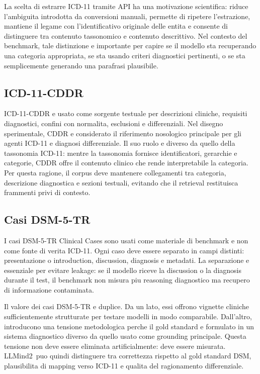\documentclass[11pt,a4paper]{article}
\newcommand{\llmind}{LLMind2}
\begin{document}
La scelta di estrarre ICD-11 tramite API ha una motivazione scientifica: riduce l'ambiguita introdotta da conversioni manuali, permette di ripetere l'estrazione, mantiene il legame con l'identificativo originale delle entita e consente di distinguere tra contenuto tassonomico e contenuto descrittivo. Nel contesto del benchmark, tale distinzione e importante per capire se il modello sta recuperando una categoria appropriata, se sta usando criteri diagnostici pertinenti, o se sta semplicemente generando una parafrasi plausibile.

\subsection{ICD-11-CDDR}
ICD-11-CDDR e usato come sorgente testuale per descrizioni cliniche, requisiti diagnostici, confini con normalita, esclusioni e differenziali. Nel disegno sperimentale, CDDR e considerato il riferimento nosologico principale per gli agenti ICD-11 e diagnosi differenziale. Il suo ruolo e diverso da quello della tassonomia ICD-11: mentre la tassonomia fornisce identificatori, gerarchie e categorie, CDDR offre il contenuto clinico che rende interpretabile la categoria. Per questa ragione, il corpus deve mantenere collegamenti tra categoria, descrizione diagnostica e sezioni testuali, evitando che il retrieval restituisca frammenti privi di contesto.

\subsection{Casi DSM-5-TR}
I casi DSM-5-TR Clinical Cases sono usati come materiale di benchmark e non come fonte di verita ICD-11. Ogni caso deve essere separato in campi distinti: presentazione o introduction, discussion, diagnosis e metadati. La separazione e essenziale per evitare leakage: se il modello riceve la discussion o la diagnosis durante il test, il benchmark non misura piu reasoning diagnostico ma recupero di informazione contaminata.

Il valore dei casi DSM-5-TR e duplice. Da un lato, essi offrono vignette cliniche sufficientemente strutturate per testare modelli in modo comparabile. Dall'altro, introducono una tensione metodologica perche il gold standard e formulato in un sistema diagnostico diverso da quello usato come grounding principale. Questa tensione non deve essere eliminata artificialmente: deve essere misurata. \llmind\ puo quindi distinguere tra correttezza rispetto al gold standard DSM, plausibilita di mapping verso ICD-11 e qualita del ragionamento differenziale.
\end{document}
